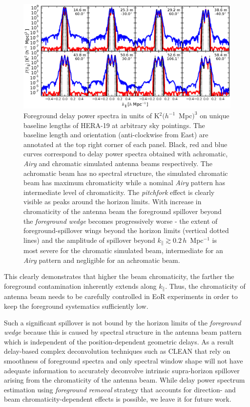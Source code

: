 \documentclass[preprint2,iop,numberedappendix,twocolappendix,appendixfloats]{emulateapj}
\begin{document}
\begin{figure}[htb]
  \centering
  \includegraphics[width=\linewidth]{asm_foreground_eor_beam_chromaticity_fullband_bhw2.0.eps}
  \caption{Foreground delay power spectra in units of K$^2 (h^{-1}$~Mpc$)^3$ on unique baseline lengths of HERA-19 at arbitrary sky pointings. The baseline length and orientation (anti-clockwise from East) are annotated at the top right corner of each panel. Black, red and blue curves correspond to delay power spectra obtained with achromatic, {\it Airy} and chromatic simulated antenna beams respectively. The achromatic beam has no spectral structure, the simulated chromatic beam has maximum chromaticity while a nominal {\it Airy} pattern has intermediate level of chromaticity. The {\it pitchfork} effect is clearly visible as peaks around the horizon limits. With increase in chromaticity of the antenna beam the foreground spillover beyond the {\it foreground wedge} becomes progressively worse - the extent of foreground-spillover wings beyond the horizon limits (vertical dotted lines) and the amplitude of spillover beyond $k_\parallel\gtrsim 0.2\,h$~Mpc$^{-1}$ is most severe for the chromatic simulated beam, intermediate for an {\it Airy} pattern and negligible for an achromatic beam.}
  \label{fig:asm-dps-beam-chromaticity-baselines}
\end{figure}

This clearly demonstrates that higher the beam chromaticity, the farther the foreground contamination inherently extends along $k_\parallel$. Thus, the chromaticity of antenna beam needs to be carefully controlled in EoR experiments in order to keep the foreground systematics sufficiently low.

Such a significant spillover is not bound by the horizon limits of the {\it foreground wedge} because this is caused by spectral structure in the antenna beam pattern which is independent of the position-dependent geometric delays. As a result delay-based complex deconvolution techniques such as CLEAN \citep{tay99,par09,par12b} that rely on smoothness of foreground spectra and only spectral window shape will not have adequate information to accurately deconvolve intrinsic supra-horizon spillover arising from the chromaticity of the antenna beam. While delay power spectrum estimation using {\it foreground removal} strategy that accounts for direction- and beam chromaticity-dependent effects is possible, we leave it for future work.
\end{document}
